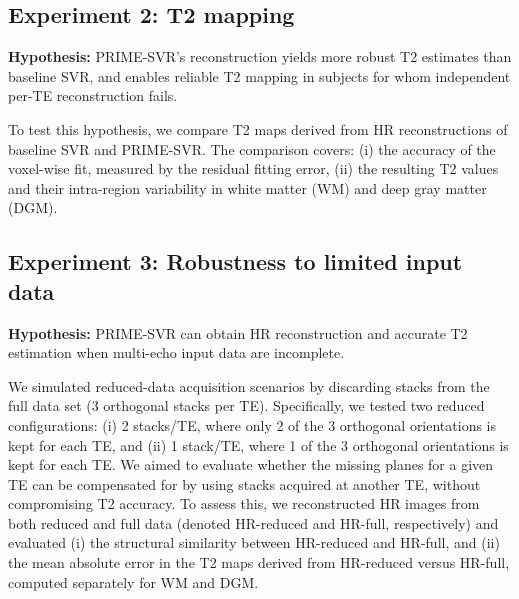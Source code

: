 \documentclass[preprint,authoryear,12pt]{elsarticle}
\begin{document}
\subsection{Experiment 2: T2 mapping}
\begin{boxK}
\noindent\textbf{Hypothesis:} PRIME-SVR's reconstruction yields more robust T2 estimates than baseline SVR, and enables reliable T2 mapping in subjects for whom independent per-TE reconstruction fails.

\end{boxK}

To test this hypothesis, we compare T2 maps derived from HR reconstructions of baseline SVR and PRIME-SVR.
The comparison covers: (i) the accuracy of the voxel-wise fit, measured by the residual fitting error, (ii) the resulting T2 values and their intra-region variability in white matter (WM) and deep gray matter (DGM).


\subsection{Experiment 3: Robustness to limited input data}
\begin{boxK}
\noindent\textbf{Hypothesis:} PRIME-SVR can obtain HR reconstruction and accurate T2 estimation when multi-echo input data are incomplete.
\end{boxK}

We simulated reduced-data acquisition scenarios by discarding stacks from the full data set (3 orthogonal stacks per TE). Specifically, we tested two reduced configurations: (i) 2 stacks/TE, where only 2 of the 3 orthogonal orientations is kept for each TE, and (ii) 1 stack/TE, where 1 of the 3 orthogonal orientations is kept for each TE. We aimed to evaluate whether the missing planes for a given TE can be compensated for by using stacks acquired at another TE, without compromising T2 accuracy. To assess this, we reconstructed HR images from both reduced and full data (denoted HR-reduced and HR-full, respectively) and evaluated (i) the structural similarity between HR-reduced and HR-full, and (ii) the mean absolute error in the T2 maps derived from HR-reduced versus HR-full, computed separately for WM and DGM.
\end{document}
